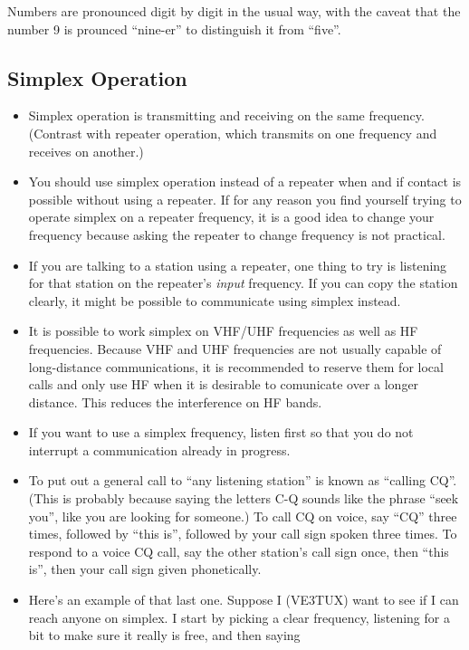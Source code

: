 \documentclass[letterpaper,12pt]{scrartcl}
\begin{document}
Numbers are pronounced digit by digit in the usual way, with the caveat that the number 9 is prounced ``nine-er'' to distinguish it from ``five''.

\subsection{Simplex Operation}

\begin{itemize}
\item Simplex operation is transmitting and receiving on the same frequency.
(Contrast with repeater operation, which transmits on one frequency and receives on another.)
\item You should use simplex operation instead of a repeater when and if contact is possible without using a repeater.
If for any reason you find yourself trying to operate simplex on a repeater frequency, it is a good idea to change your frequency
because asking the repeater to change frequency is not practical.
\item If you are talking to a station using a repeater, one thing to try is listening for that station on the repeater's \textit{input} frequency.
If you can copy the station clearly, it might be possible to communicate using simplex instead.
\item It is possible to work simplex on VHF/UHF frequencies as well as HF frequencies.
Because VHF and UHF frequencies are not usually capable of long-distance communications, it is recommended to reserve them for local calls
and only use HF when it is desirable to comunicate over a longer distance. This reduces the interference on HF bands.
\item If you want to use a simplex frequency, listen first so that you do not interrupt a communication already in progress.
\item To put out a general call to ``any listening station'' is known as ``calling CQ''. (This is probably because saying the letters C-Q sounds like the phrase ``seek you'',
like you are looking for someone.) To call CQ on voice, say ``CQ'' three times, followed by ``this is'', followed by your call sign spoken three times.
To respond to a voice CQ call, say the other station's call sign once, then ``this is'', then your call sign given phonetically.
\item Here's an example of that last one. Suppose I (VE3TUX) want to see if I can reach anyone on simplex.
I start by picking a clear frequency, listening for a bit to make sure it really is free, and then saying 

\end{itemize}
\end{document}
